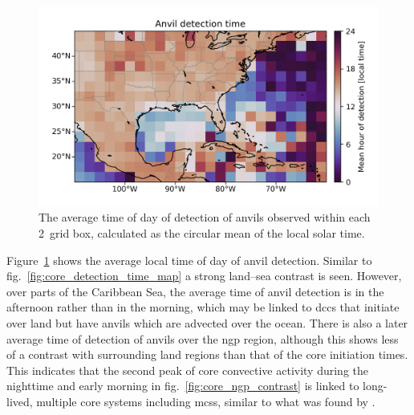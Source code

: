 \begin{figure}[tp]
    \centering
    \includegraphics[width=\textwidth]{figures/chapter2_23.png}
    \caption[
    The average time of detection of anvils
    ]{
    The average time of day of detection of anvils observed within each 2\textdegree\ grid box, calculated as the circular mean of the local solar time.
    }
    \label{fig:anvil_detection_time_map}
\end{figure}

Figure~\ref{fig:anvil_detection_time_map} shows the average local time of day of anvil detection.
Similar to fig.~\ref{fig:core_detection_time_map} a strong land--sea contrast is seen.
However, over parts of the Caribbean Sea, the average time of anvil detection is in the afternoon rather than in the morning, which may be linked to \acrshort{dcc}s that initiate over land but have anvils which are advected over the ocean.
There is also a later average time of detection of anvils over the \acrshort{ngp} region, although this shows less of a contrast with surrounding land regions than that of the core initiation times.
This indicates that the second peak of core convective activity during the nighttime and early morning in fig.~\ref{fig:core_ngp_contrast} is linked to long-lived, multiple core systems including \acrshort{mcs}s, similar to what was found by \citet{feng_spatiotemporal_2019}.


